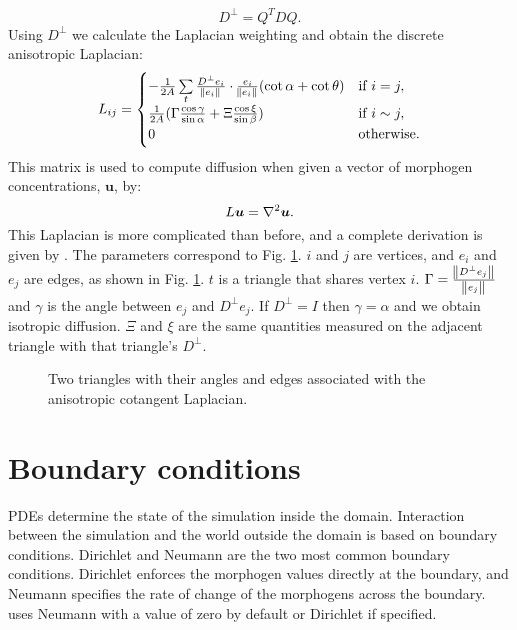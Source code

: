 \begin{equation} 
	D^\perp = Q^T D Q.
\label{eq:perpTensor}
\end{equation}
Using $D^\perp$ we calculate the Laplacian weighting and obtain the discrete anisotropic Laplacian:
\begin{equation} 
   L_{ij} =
   \begin{cases} 
      -\frac{1}{2A}\sum\limits_{t} \frac{D^\perp e_i}{\norm{e_i}} \cdot \frac{e_i}{\norm{e_i}}(\cot{\alpha}+\cot{\theta})  & \text{if } i = j, \\
      \frac{1}{2A}(\Gamma \frac{\cos{\gamma}}{\sin{\alpha}} + \Xi\frac{\cos{\xi}}{\sin{\beta}})                                     & \text{if } i \sim j, \\
      0 & \text{otherwise.}
   \end{cases}
   \label{eq:anisoLaplacian}
\end{equation}
This matrix is used to compute diffusion when given a vector of morphogen concentrations, $\bm{u}$, by:
\begin{equation}
	L\bm{u} = \nabla^2 \bm{u}.
\end{equation}
This Laplacian is more complicated than before, and a complete derivation is given by \citet{mathieu2014}. The parameters correspond to Fig. \ref{fig:meshLaplacian}. $i$ and $j$ are vertices, and $e_i$ and $e_j$ are edges, as shown in Fig. \ref{fig:meshLaplacian}. $t$ is a triangle that shares vertex $i$. $\Gamma = \frac{\norm{D^\perp e_j}}{\norm{e_j}}$ and $\gamma$ is the angle between $e_j$ and $D^\perp e_j$. If $D^{\perp} = I$ then $\gamma = \alpha$ and we obtain isotropic diffusion. $\Xi$ and $\xi$ are the same quantities measured on the adjacent triangle with that triangle's $D^\perp$. 

\begin{figure}[H]
	\centering
	\caption[Two triangles with their angles and edges associated with the anisotropic cotangent Laplacian]{Two triangles with their angles and edges associated with the anisotropic cotangent Laplacian.}
	\label{fig:meshLaplacian}
\end{figure}

\section{Boundary conditions}
PDEs determine the state of the simulation inside the domain. Interaction between the simulation and the world outside the domain is based on boundary conditions. Dirichlet and Neumann are the two most common boundary conditions. Dirichlet enforces the morphogen values directly at the boundary, and Neumann specifies the rate of change of the morphogens across the boundary. \ProgramName{} uses Neumann with a value of zero by default or Dirichlet if specified.

